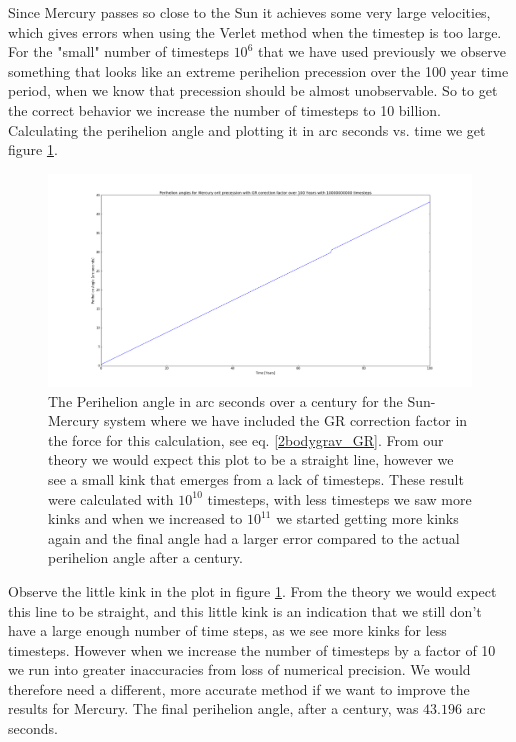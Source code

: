 \documentclass[a4paper,11pt]{article}
\begin{document}
{Since Mercury passes so close to the Sun it achieves some very large velocities, which gives errors when using the Verlet method when the timestep is too large. For the "small" number of timesteps $10^{6}$ that we have used previously we observe something that looks like an extreme perihelion precession over the 100 year time period, when we know that precession should be almost unobservable. So to get the correct behavior we increase the number of timesteps to 10 billion. Calculating the perihelion angle and plotting it in arc seconds vs. time we get figure \ref{fig:perihelion}.


\begin{figure}[H]
	\centering
	\includegraphics[scale=0.35]{figure_2}
	\caption{The Perihelion angle in arc seconds over a century for the Sun-Mercury system where we have included the GR correction factor in the force for this calculation, see eq. \ref{2bodygrav_GR}. From our theory we would expect this plot to be a straight line, however we see a small kink that emerges from a lack of timesteps. These result were calculated with $10^{10}$ timesteps, with less timesteps we saw more kinks and when we increased to $10^{11}$ we started getting more kinks again and the final angle had a larger error compared to the actual perihelion angle after a century.}
	\label{fig:perihelion}
\end{figure}

Observe the little kink in the plot in figure \ref{fig:perihelion}. From the theory we would expect this line to be straight, and this little kink is an indication that we still don't have a large enough number of time steps, as we see more kinks for less timesteps. However when we increase the number of timesteps by a factor of 10 we run into greater inaccuracies from loss of numerical precision. We would therefore need a different, more accurate method if we want to improve the results for Mercury. The final perihelion angle, after a century, was $43.196$ arc seconds.


}
\end{document}
